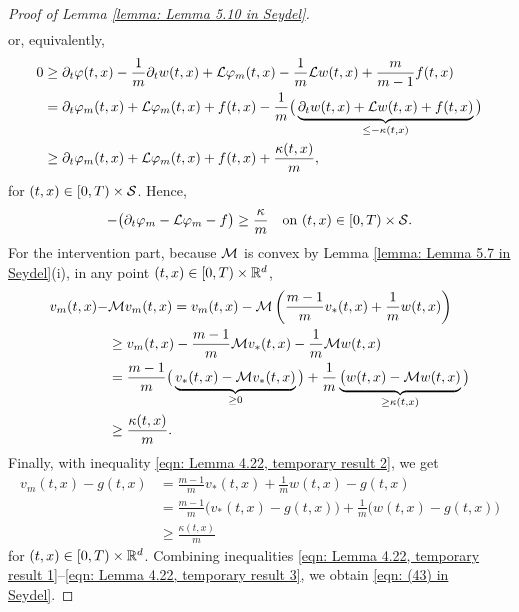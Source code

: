 \begin{proof}[Proof of Lemma \ref{lemma: Lemma 5.10 in Seydel}]
\begin{align*}
    \end{align*}
    or, equivalently,
    \begin{align*}
        0 &\geq \partial_t \varphi(t,x) - \frac 1 m \partial_t w(t,x) + \mathcal{L} \varphi_m(t,x) - \frac 1 m \mathcal{L} w(t,x) + \frac{m}{m-1} f(t,x) \\
        &= \partial_t \varphi_m(t,x) + \mathcal{L} \varphi_m(t,x) + f(t,x) - \frac{1}{m} \big( \underbrace{\partial_t w(t,x) + \mathcal{L} w(t,x) + f(t,x)}_{\leq -\kappa(t,x)} \big) \\
        &\geq \partial_t \varphi_m(t,x) + \mathcal{L} \varphi_m(t,x) + f(t,x) + \frac{\kappa(t,x)}{m},
    \end{align*}
    for $(t,x) \in [0,T)\times \mathcal{S}$. Hence, 
    \begin{equation}
        -\big( \partial_t \varphi_m - \mathcal{L} \varphi_m - f\big) \geq \frac{\kappa}{m} \quad \text{on } (t,x) \in [0,T) \times \mathcal{S}.
        \label{eqn: Lemma 4.22, temporary result 1}
    \end{equation}
    For the intervention part, because $\mathcal{M}$ is convex by Lemma \ref{lemma: Lemma 5.7 in Seydel}(i), in any point $(t,x) \in [0,T) \times \mathbb{R}^d$,
    \begin{align}
        v_m(t,x) - & \mathcal{M} v_m(t,x) = v_m(t,x) - \mathcal{M} \left( \frac{m-1}{m} v_*(t,x) + \frac 1 m w(t,x) \right) \nonumber\\
        &\geq v_m(t,x) - \frac{m-1}{m} \mathcal{M} v_*(t,x) - \frac{1}{m} \mathcal{M} w(t,x) \nonumber \\
        &= \frac{m-1}{m} \big( \underbrace{v_*(t,x) - \mathcal{M} v_*(t,x)}_{\geq 0} \big) + \frac 1 m \underbrace{\big(w(t,x) - \mathcal{M} w(t,x)}_{\geq \kappa(t,x)} \big) \nonumber \\
        &\geq \frac{\kappa(t,x)}{m}. \label{eqn: Lemma 4.22, temporary result 2}
    \end{align}
    Finally, with inequality \eqref{eqn: Lemma 4.22, temporary result 2}, we get
    \begin{align}
        v_m(t,x) - g(t,x) &= \frac{m-1}{m} v_*(t,x) + \frac{1}{m} w(t,x) - g(t,x) \nonumber \\
        &= \frac{m-1}{m} \big( v_*(t,x) - g(t,x) \big) + \frac 1 m \big( w(t,x) - g(t,x) \big) \nonumber  \\
        & \geq \frac{\kappa(t,x)}{m}
        \label{eqn: Lemma 4.22, temporary result 3}
    \end{align}
    for $(t,x) \in [0,T) \times \mathbb{R}^d$. Combining inequalities \eqref{eqn: Lemma 4.22, temporary result 1}--\eqref{eqn: Lemma 4.22, temporary result 3}, we obtain \eqref{eqn: (43) in Seydel}. 
    

\end{proof}
